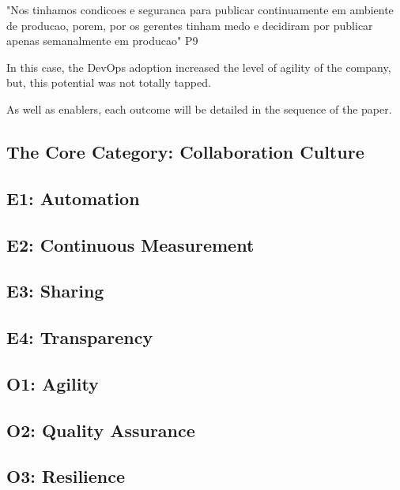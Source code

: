 "Nos tinhamos condicoes e seguranca para publicar continuamente em ambiente de
producao, porem, por os gerentes tinham medo e decidiram por publicar apenas
semanalmente em producao" P9

In this case, the DevOps adoption increased the level of agility of the company,
but, this potential was not totally tapped.

As well as enablers, each outcome will be detailed in the sequence of the paper.

\subsection{The Core Category: Collaboration Culture}

\subsection{E1: Automation}

\subsection{E2: Continuous Measurement}

\subsection{E3: Sharing}

\subsection{E4: Transparency}

\subsection{O1: Agility}

\subsection{O2: Quality Assurance}

\subsection{O3: Resilience}
